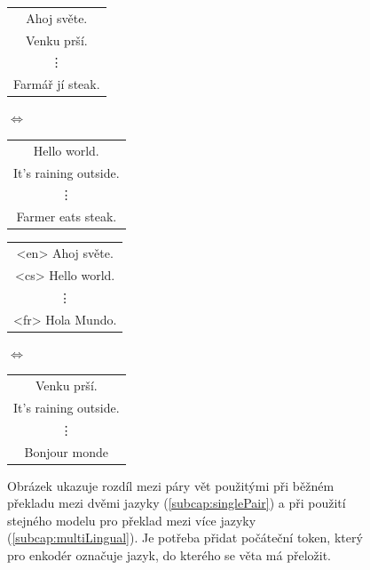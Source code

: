 \begin{figure}[H]
    \begin{center}
        \begin{tabular}{|c|}
          \hline
          Ahoj světe. \\
          Venku prší. \\
          \vdots \\
          Farmář jí steak. \\
          \hline
        \end{tabular}
        $\Longleftrightarrow$
        \begin{tabular}{|c|}
          \hline
          Hello world. \\
          It's raining outside. \\
          \vdots \\
          Farmer eats steak. \\
          \hline
        \end{tabular}
    \end{center}
    \begin{minipage}[t]{1\linewidth}
        \centering
        \label{subcap:singlePair}
    \end{minipage}%

    \begin{center}
        \begin{tabular}{|c|}
          \hline
          <en> Ahoj světe. \\
          <cs> Hello world. \\
          \vdots \\
          <fr> Hola Mundo. \\
          \hline
        \end{tabular}
        $\Longleftrightarrow$
        \begin{tabular}{|c|}
          \hline
          Venku prší. \\
          It's raining outside. \\
          \vdots \\
          Bonjour monde \\
          \hline
        \end{tabular}
    \end{center}
    \begin{minipage}[t]{1\linewidth}
        \centering
        \label{subcap:multiLingual}
    \end{minipage}%

	\caption{Obrázek ukazuje rozdíl mezi páry vět použitými při běžném překladu mezi dvěmi jazyky (\ref{subcap:singlePair}) a při použití stejného modelu pro překlad mezi více jazyky (\ref{subcap:multiLingual}). Je potřeba přidat počáteční token, který pro enkodér označuje jazyk, do kterého se věta má přeložit.}
	\label{figure:multiLingDataset}
\end{figure}

